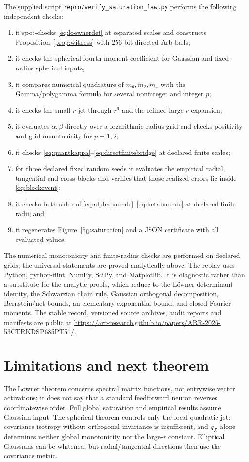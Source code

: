 \documentclass[11pt]{article}
\begin{document}
The supplied script \texttt{repro/verify\_saturation\_law.py} performs the following independent checks:
\begin{enumerate}[leftmargin=2em]
 \item it spot-checks \eqref{eq:loewnerdet} at separated scales and constructs Proposition~\ref{prop:witness} with
 256-bit directed Arb balls;
 \item it checks the spherical fourth-moment coefficient for Gaussian and fixed-radius spherical inputs;
 \item it compares numerical quadrature of $m_0,m_2,m_4$ with the Gamma/polygamma formula for several
 noninteger and integer $p$;
 \item it checks the small-$r$ jet through $r^6$ and the refined large-$r$ expansion;
 \item it evaluates $\alpha,\beta$ directly over a logarithmic radius grid and checks positivity and grid
 monotonicity for $p=1,2$;
 \item it checks \eqref{eq:quantkappa}--\eqref{eq:directfinitebridge} at declared finite scales;
 \item for three declared fixed random seeds it evaluates the empirical radial, tangential and cross blocks and
 verifies that those realized errors lie inside \eqref{eq:blockevent};
 \item it checks both sides of \eqref{eq:alphabounds}--\eqref{eq:betabounds} at declared finite radii; and
 \item it regenerates Figure~\ref{fig:saturation} and a JSON certificate with all evaluated values.
\end{enumerate}
The numerical monotonicity and finite-radius checks are performed on declared grids; the universal statements are
proved analytically above.  The replay uses Python, python-flint, NumPy, SciPy, and Matplotlib.  It is diagnostic
rather than a substitute for
the analytic proofs, which reduce to the L\"owner determinant identity, the Schwarzian chain rule, Gaussian
orthogonal decomposition, Bernstein/net bounds, an elementary exponential bound, and closed Fourier moments.
The stable record, versioned source archives, audit reports and manifests are public at
\url{https://arr-research.github.io/papers/ARR-2026-53CTRKDSP685PT51/}.

\section{Limitations and next theorem}

The L\"owner theorem concerns spectral matrix functions, not entrywise vector activations; it does not say that a
standard feedforward neuron reverses coordinatewise order.  Full global saturation and empirical results assume
Gaussian input.  The spherical theorem controls only the local quadratic jet: covariance isotropy without
orthogonal invariance is insufficient, and $q_X$ alone determines neither global monotonicity nor the large-$r$
constant.  Elliptical Gaussians can be whitened, but radial/tangential directions then use the covariance metric.
\end{document}
